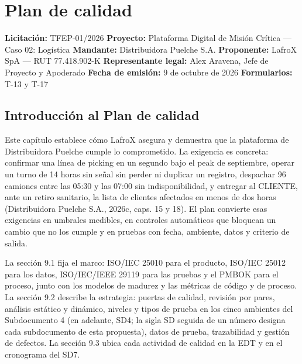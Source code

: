 \chapter{Plan de calidad}
\label{cap:sd9}

\textbf{Licitación:} TFEP-01/2026
\textbf{Proyecto:} Plataforma Digital de Misión Crítica — Caso 02: Logística
\textbf{Mandante:} Distribuidora Puelche S.A.
\textbf{Proponente:} LafroX SpA — RUT 77.418.902-K
\textbf{Representante legal:} Alex Aravena, Jefe de Proyecto y Apoderado
\textbf{Fecha de emisión:} 9 de octubre de 2026
\textbf{Formularios:} T-13 y T-17

\section*{Introducción al Plan de calidad}

Este capítulo establece cómo LafroX asegura y demuestra que la plataforma de Distribuidora Puelche cumple lo comprometido. La exigencia es concreta: confirmar una línea de picking en un segundo bajo el peak de septiembre, operar un turno de 14 horas sin señal sin perder ni duplicar un registro, despachar 96 camiones entre las 05:30 y las 07:00 sin indisponibilidad, y entregar al CLIENTE, ante un retiro sanitario, la lista de clientes afectados en menos de dos horas (Distribuidora Puelche S.A., 2026c, caps. 15 y 18). El plan convierte esas exigencias en umbrales medibles, en controles automáticos que bloquean un cambio que no los cumple y en pruebas con fecha, ambiente, datos y criterio de salida.

La sección 9.1 fija el marco: ISO/IEC 25010 para el producto, ISO/IEC 25012 para los datos, ISO/IEC/IEEE 29119 para las pruebas y el PMBOK para el proceso, junto con los modelos de madurez y las métricas de código y de proceso. La sección 9.2 describe la estrategia: puertas de calidad, revisión por pares, análisis estático y dinámico, niveles y tipos de prueba en los cinco ambientes del Subdocumento 4 (en adelante, SD4; la sigla SD seguida de un número designa cada subdocumento de esta propuesta), datos de prueba, trazabilidad y gestión de defectos. La sección 9.3 ubica cada actividad de calidad en la EDT y en el cronograma del SD7.

